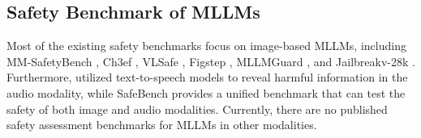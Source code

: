 \subsection{Safety Benchmark of MLLMs}
Most of the existing safety benchmarks focus on image-based MLLMs, including MM-SafetyBench \cite{liu2024mm}, Ch3ef \cite{shi2024assessment}, VLSafe \cite{chen2024dress}, Figstep \cite{gong2023figstep}, MLLMGuard \cite{gu2024mllmguard}, and Jailbreakv-28k \cite{luo2024jailbreakv}.
Furthermore, \citet{yang2024audio} utilized text-to-speech models to reveal harmful information in the audio modality, while SafeBench \cite{ying2024safebench} provides a unified benchmark that can test the safety of both image and audio modalities. 
Currently, there are no published safety assessment benchmarks for MLLMs in other modalities.